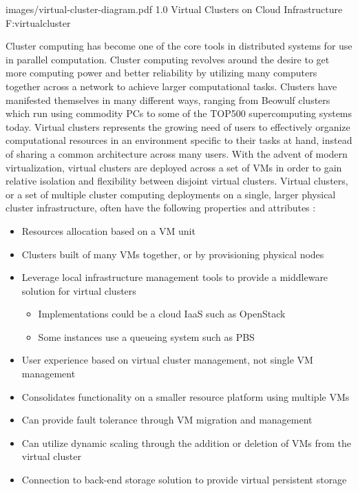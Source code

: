   {images/virtual-cluster-diagram.pdf}
  {1.0}
  {Virtual Clusters on Cloud Infrastructure}
  {F:virtualcluster}


Cluster computing has become one of the core tools in distributed systems for use in parallel computation.  %
Cluster computing revolves around the desire to get more computing power and better reliability by utilizing many computers together across a network to achieve larger computational tasks. Clusters have manifested themselves in many different ways, ranging from Beowulf clusters \cite{sterling2001beowulf} which run using commodity PCs to some of the TOP500 \cite{www-top500} supercomputing systems today.  Virtual clusters represents the growing need of users to effectively organize computational resources in an environment specific to their tasks at hand, instead of sharing a common architecture across many users. With the advent of modern virtualization, virtual clusters are deployed across a set of VMs in order to gain relative isolation and flexibility between disjoint virtual clusters. Virtual clusters, or a set of multiple cluster computing deployments on a single, larger physical cluster infrastructure, often have the following properties and attributes \cite{hwang2013distributed}:


\begin{itemize}
\item Resources allocation based on a VM unit
\item Clusters built of many VMs together, or by provisioning physical nodes
\item Leverage local infrastructure management tools to provide a middleware solution for virtual clusters
	\begin{itemize}
	\item Implementations could be a cloud IaaS such as OpenStack
	\item Some instances use a queueing system such as PBS
	\end{itemize}
\item User experience based on virtual cluster management, not single VM management
\item Consolidates functionality on a smaller resource platform using multiple VMs 
\item Can provide fault tolerance through VM migration and management
\item Can utilize dynamic scaling through the addition or deletion of VMs from the virtual cluster
\item Connection to back-end storage solution to provide virtual persistent storage
\end{itemize}



